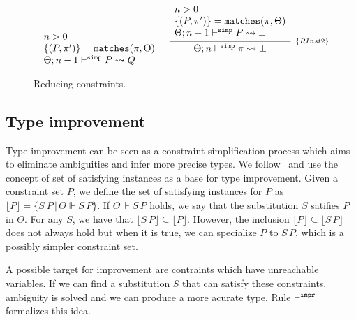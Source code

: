 \documentclass[a4paper, 11pt]{article}
\theoremstyle{definition}
\begin{document}
\begin{figure}[H]
\[\begin{array}{cc}
{\begin{array}{l}
              n > 0 \\ 
              \{(P,\pi')\} = \mathtt{matches}(\pi,\Theta)\\
              \Theta;n - 1 \simp P \leadsto Q
             \end{array}}
      &
      \infer[_{\{RInst2\}}]
            {\Theta ; n \simp \pi \leadsto \bot}
            {\begin{array}{l}
              n > 0 \\ 
              \{(P,\pi')\} = \mathtt{matches}(\pi,\Theta)\\
              \Theta;n - 1 \simp P \leadsto \bot
             \end{array}}

    \end{array}
  \]
  \centering
  \caption{Reducing constraints.}
  \label{fig:reduce-constraints}
\end{figure}

\subsection{Type improvement}

Type improvement can be seen as a constraint simplification 
process which aims to eliminate ambiguities and infer more 
precise types. We follow~\cite{Jones1995} and use the concept 
of set of satisfying instances as a base for type improvement.
Given a constraint set $P$, we define the set of satisfying
instances for $P$ as $\lfloor P \rfloor = \{S\:P\,|\,\Theta\Vdash S\,P\}$. 
If $\Theta\Vdash S\,P$ holds, we say that the substitution $S$ 
satifies $P$ in $\Theta$. For any $S$, we have that 
$\lfloor S\,P\rfloor \subseteq\lfloor P \rfloor$. However, the 
inclusion $\lfloor P \rfloor \subseteq \lfloor S\,P\rfloor$ does not 
always hold but when it is true, we can  specialize 
$P$ to $S\,P$, which is a possibly simpler constraint set.

A possible target for improvement are contraints which 
have unreachable variables. If we can find a substitution 
$S$ that can satisfy these constraints, ambiguity is solved 
and we can produce a more acurate type. Rule $\vdash^{\mathtt{impr}}$ formalizes 
this idea.
\end{document}
